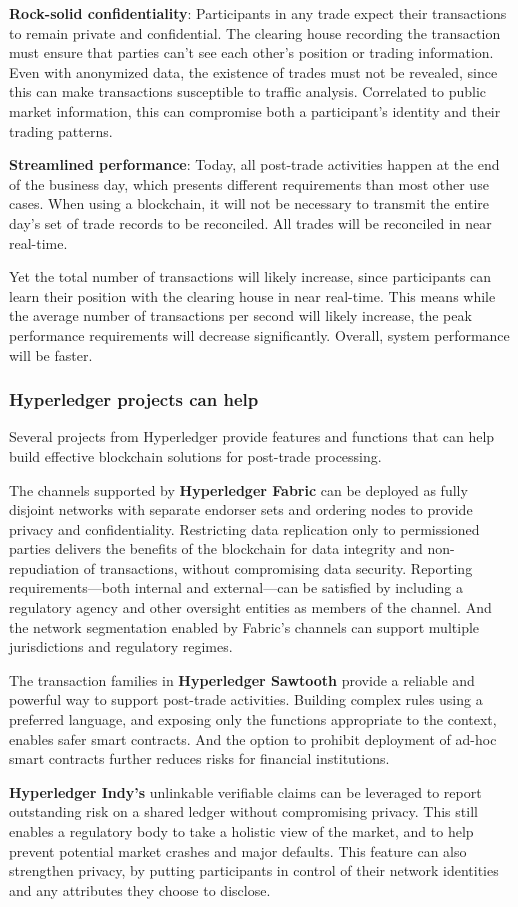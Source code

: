 \textbf{Rock-solid confidentiality}: Participants in any trade expect their transactions to remain private and confidential. 
The clearing house recording the transaction must ensure that parties can't see each other's position or trading information. 
Even with anonymized data, the existence of trades must not be revealed, since this can make transactions susceptible to traffic analysis. 
Correlated to public market information, this can compromise both a participant's identity and their trading patterns. 

\textbf{Streamlined performance}: Today, all post-trade activities happen at the end of the business day, which presents different  requirements than most other use cases. 
When using a blockchain, it will not be necessary to transmit the entire day's set of trade records to be reconciled. 
All trades will be reconciled in near real-time. 

Yet the total number of transactions will likely increase, since participants can learn their position with the clearing house in near real-time. 
This means while the average number of transactions per second will likely increase, the peak performance requirements will decrease significantly. 
Overall, system performance will be faster. 

\subsubsection{Hyperledger projects can help}
Several projects from Hyperledger provide features and functions that can help build effective  blockchain solutions for post-trade processing. 

The channels supported by \textbf{Hyperledger Fabric} can be deployed as fully disjoint networks with separate endorser sets and ordering nodes to provide privacy and confidentiality. 
Restricting data replication only to permissioned parties delivers the benefits of the blockchain for data integrity and non-repudiation of transactions, without compromising data security. 
Reporting requirements---both internal and external---can be satisfied by including a regulatory agency and other oversight entities as members of the channel. 
And the network segmentation enabled by Fabric's channels can support multiple jurisdictions and regulatory regimes.

The transaction families in \textbf{Hyperledger Sawtooth} provide a reliable and powerful way to support post-trade activities. 
Building complex rules using a preferred language, and exposing only the functions appropriate to the context, enables safer smart contracts. 
And the option to prohibit  deployment of ad-hoc smart contracts further reduces risks for financial institutions.

\textbf{Hyperledger Indy's} unlinkable verifiable claims can be leveraged to report outstanding risk on a shared ledger without compromising privacy. This still enables a regulatory body to take a holistic view of the market, and to help prevent potential market crashes and major defaults. This feature can also strengthen privacy, by putting participants in control of their network identities and any attributes they choose to disclose.

